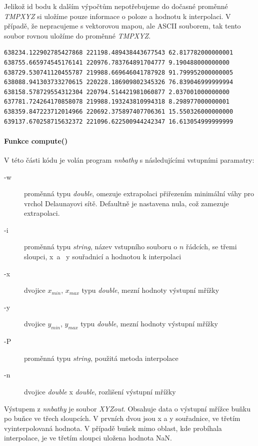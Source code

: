 \documentclass[12pt,a4paper]{article}
\begin{document}
Jelikož id bodu k dalším výpočtům nepotřebujeme do dočasné proměnné
\emph{TMPXYZ} si uložíme pouze informace o poloze a hodnotu k
interpolaci. V případě, že nepracujeme s vektorovou mapou, ale ASCII
souborem, tak tento soubor rovnou uložíme do proměnné \emph{TMPXYZ}.

\newpage
\lstset{basicstyle=\footnotesize}
\begin{lstlisting}[caption={Pomocný soubor TMPXYZ}]
638234.122902785427868 221198.489438443677543 62.817782000000001
638755.665974545176141 220976.783764891704777 9.190488000000000
638729.530741120455787 219988.669646041787928 91.799952000000005
638088.941303733270615 220228.186909802345326 76.839046999999994
638158.578729554312304 220794.514421981060877 2.037001000000000
637781.724264170858078 219988.193243810994318 8.298977000000001
638359.847223712014966 220692.375897407706361 15.550326000000000
639137.670258715632372 221096.622500944242347 16.613054999999999
\end{lstlisting}

\bigskip
\paragraph{Funkce compute()}

V této části kódu je volán program \emph{nnbathy} s následujícími
vstupními paramatry:
\begin{description}
\item[-w]{proměnná typu \emph{double}, omezuje extrapolaci přiřezením minimální váhy pro vrchol Delaunayovi sítě. Defaultně je nastavena nula, což zamezuje extrapolaci.}
\item[-i]{proměnná typu \emph{string}, název vstupního souboru o $n$ řádcích, se třemi sloupci, x~a~ y souřadnicí a hodnotou k interpolaci}
\item[-x]{dvojice $x_{min}$, $x_{max}$ typu \emph{double}, mezní hodnoty výstupní mřížky}
\item[-y]{dvojice $y_{min}$, $y_{max}$ typu \emph{double}, mezní hodnoty výstupní mřížky}
\item[-P]{proměnná typu \emph{string}, použitá metoda interpolace}
\item[-n]{dvojice \emph{double} x \emph{double}, rozlišení výstupní mřížky}
\end{description}

Výstupem z \emph{nnbathy} je soubor \emph{XYZout}. Obsahuje data o
výstupní mřížce buňku po buňce ve třech sloupcích. V prvních dvou jsou
x a y souřadnice, ve třetím vyinterpolovaná hodnota. V případě buňek
mimo oblast, kde probíhala interpolace, je ve třetím sloupci uložena
hodnota NaN.
\end{document}
